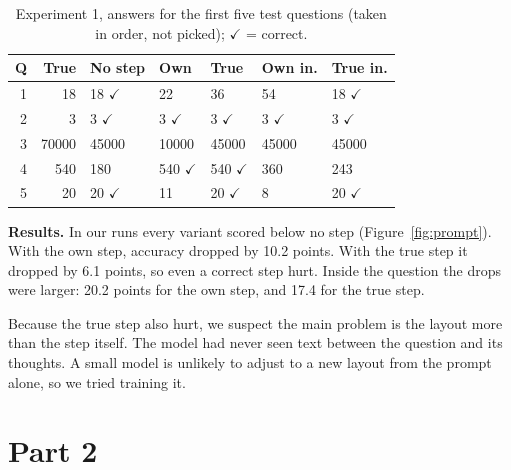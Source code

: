 \documentclass[10pt,letterpaper]{article}
\begin{document}
\begin{table}[t]
\begin{center}
\caption{Experiment 1, answers for the first five test questions (taken in order, not picked); $\checkmark$ =
correct.}
\label{tab:cases}
\vskip 0.08in
\footnotesize
\begin{tabular}{rrlllll}
\toprule
Q & True & No step & Own & True & Own in. & True in. \\
\midrule
1 & 18 & 18 $\checkmark$ & 22 & 36 & 54 & 18 $\checkmark$ \\
2 & 3 & 3 $\checkmark$ & 3 $\checkmark$ & 3 $\checkmark$ & 3 $\checkmark$ & 3 $\checkmark$ \\
3 & 70000 & 45000 & 10000 & 45000 & 45000 & 45000 \\
4 & 540 & 180 & 540 $\checkmark$ & 540 $\checkmark$ & 360 & 243 \\
5 & 20 & 20 $\checkmark$ & 11 & 20 $\checkmark$ & 8 & 20 $\checkmark$ \\
\bottomrule
\end{tabular}
\end{center}
\end{table}

\textbf{Results.} In our runs every variant scored below no step (Figure~\ref{fig:prompt}). With the own step,
accuracy dropped by 10.2 points. With the true step it dropped by 6.1 points, so even a correct step hurt. Inside the question the drops were larger: 20.2 points
for the own step, and 17.4 for the true step.
\newline

Because the true step also hurt, we suspect the main problem is the layout more than the step itself. The model had never seen text between the question and its thoughts. A small model is unlikely to adjust to a new layout from the prompt alone, so we tried training it.

\section{Part 2}
\end{document}
